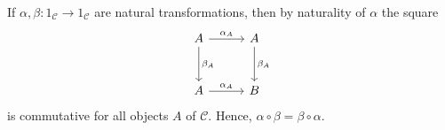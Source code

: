 If $\alpha, \beta\colon 1_{\mathcal{C}}\to 1_{\mathcal{C}}$ are natural
transformations, then by naturality of $\alpha$ the square
\[\begin{tikzcd}[row sep=1cm, column sep=1cm]
	A\ar[r, "\alpha_A"]\ar[d, "\beta_A"] & A\ar[d, "\beta_A"]\\
	A\ar[r, "\alpha_A"]& B
\end{tikzcd}\]
is commutative for all objects $A$ of $\mathcal{C}$. Hence,
$\alpha \circ \beta = \beta \circ \alpha$.
